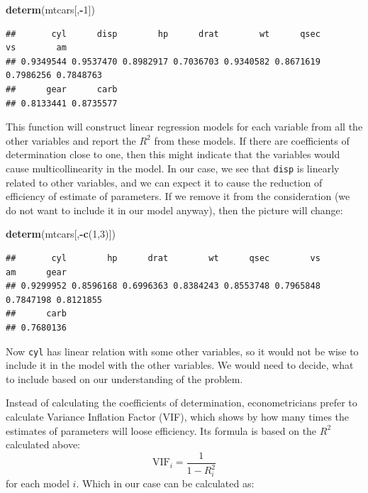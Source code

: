 \documentclass[
]{book}
\newenvironment{Shaded}{\begin{snugshade}}{\end{snugshade}}
\newcommand{\DecValTok}[1]{\textcolor[rgb]{0.00,0.00,0.81}{#1}}
\newcommand{\KeywordTok}[1]{\textcolor[rgb]{0.13,0.29,0.53}{\textbf{#1}}}
\newcommand{\NormalTok}[1]{#1}
\newcommand{\OperatorTok}[1]{\textcolor[rgb]{0.81,0.36,0.00}{\textbf{#1}}}
\theoremstyle{definition}
\theoremstyle{definition}
\theoremstyle{definition}
\theoremstyle{definition}
\theoremstyle{remark}
\begin{document}
\begin{Shaded}
\begin{Highlighting}[]
\KeywordTok{determ}\NormalTok{(mtcars[,}\OperatorTok{{-}}\DecValTok{1}\NormalTok{])}
\end{Highlighting}
\end{Shaded}

\begin{verbatim}
##       cyl      disp        hp      drat        wt      qsec        vs        am 
## 0.9349544 0.9537470 0.8982917 0.7036703 0.9340582 0.8671619 0.7986256 0.7848763 
##      gear      carb 
## 0.8133441 0.8735577
\end{verbatim}

This function will construct linear regression models for each variable from all the other variables and report the \(R^2\) from these models. If there are coefficients of determination close to one, then this might indicate that the variables would cause multicollinearity in the model. In our case, we see that \texttt{disp} is linearly related to other variables, and we can expect it to cause the reduction of efficiency of estimate of parameters. If we remove it from the consideration (we do not want to include it in our model anyway), then the picture will change:

\begin{Shaded}
\begin{Highlighting}[]
\KeywordTok{determ}\NormalTok{(mtcars[,}\OperatorTok{{-}}\KeywordTok{c}\NormalTok{(}\DecValTok{1}\NormalTok{,}\DecValTok{3}\NormalTok{)])}
\end{Highlighting}
\end{Shaded}

\begin{verbatim}
##       cyl        hp      drat        wt      qsec        vs        am      gear 
## 0.9299952 0.8596168 0.6996363 0.8384243 0.8553748 0.7965848 0.7847198 0.8121855 
##      carb 
## 0.7680136
\end{verbatim}

Now \texttt{cyl} has linear relation with some other variables, so it would not be wise to include it in the model with the other variables. We would need to decide, what to include based on our understanding of the problem.

Instead of calculating the coefficients of determination, econometricians prefer to calculate Variance Inflation Factor (VIF), which shows by how many times the estimates of parameters will loose efficiency. Its formula is based on the \(R^2\) calculated above:
\begin{equation*}
  \mathrm{VIF}_i = \frac{1}{1-R_i^2}
\end{equation*}
for each model \(i\). Which in our case can be calculated as:
\end{document}
